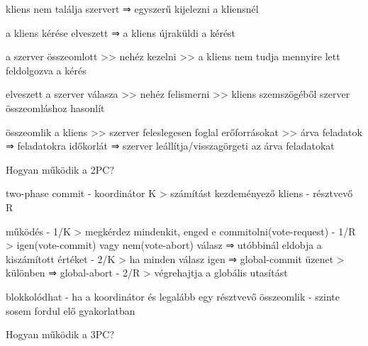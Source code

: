 \documentclass[12pt]{article}
\begin{document}
\begin{description}
                                    \item  kliens nem találja  szervert
                                        ⇒ egyszerű kijelezni a kliensnél
                                    \item a kliens kérése elveszett
                                        ⇒ a kliens újraküldi a kérést
                                    \item a szerver összeomlott
                                        >> nehéz kezelni >> a kliens nem tudja mennyire lett feldolgozva a kérés
                                    \item elveszett a szerver válasza
                                        >> nehéz felismerni >> kliens szemszögéből szerver összeomláshoz hasonlít
                                    \item összeomlik a kliens
                                        >> szerver feleslegesen foglal erőforrásokat >> árva feladatok
                                        ⇒ feladatokra időkorlát
                                        ⇒ szerver leállítja/visszagörgeti az árva feladatokat
                                    \item  Hogyan működik a 2PC?
                                    \item two-phase commit
                                        - koordinátor K 
                                        > számítást kezdeményező kliens
                                        - résztvevő R
                                    \item működés
                                        - 1/K
                                        > megkérdez mindenkit, enged e commitolni(vote-request)
                                        - 1/R
                                        > igen(vote-commit) vagy nem(vote-abort) válasz ⇒ utóbbinál eldobja a kiszámított értéket
                                        - 2/K
                                        > ha minden válasz igen ⇒ global-commit üzenet
                                        > különben ⇒ global-abort
                                        - 2/R
                                        > végrehajtja a globális utasítást
                                    \item blokkolódhat
                                        - ha a koordinátor és legalább egy résztvevő összeomlik
                                        - szinte sosem fordul elő gyakorlatban
                                    \item  Hogyan működik a 3PC?

\end{description}
\end{document}
